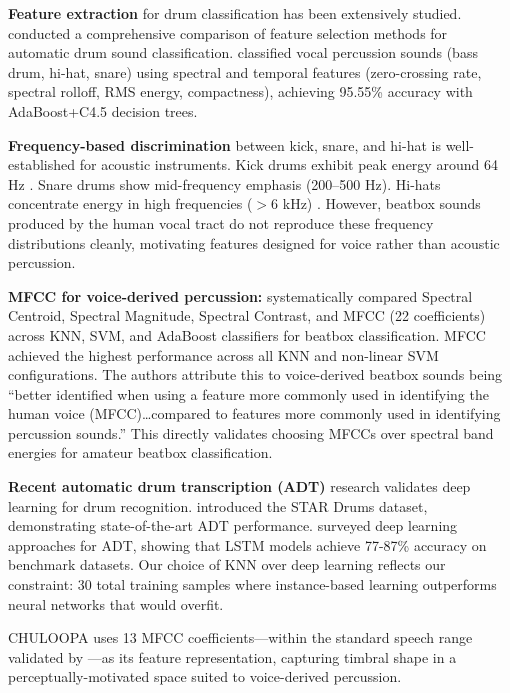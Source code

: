 \documentclass{aimc2026}
\begin{document}
\textbf{Feature extraction} for drum classification has been extensively studied. \citet{herrera2003automatic} conducted a comprehensive comparison of feature selection methods for automatic drum sound classification. \citet{sinyor2005beatbox} classified vocal percussion sounds (bass drum, hi-hat, snare) using spectral and temporal features (zero-crossing rate, spectral rolloff, RMS energy, compactness), achieving 95.55\% accuracy with AdaBoost+C4.5 decision trees.

\textbf{Frequency-based discrimination} between kick, snare, and hi-hat is well-established for acoustic instruments. Kick drums exhibit peak energy around 64 Hz \citep{lartillot2007unified}. Snare drums show mid-frequency emphasis (200--500 Hz). Hi-hats concentrate energy in high frequencies ($>$6 kHz) \citep{sillanpaa2000classification}. However, beatbox sounds produced by the human vocal tract do not reproduce these frequency distributions cleanly, motivating features designed for voice rather than acoustic percussion.

\textbf{MFCC for voice-derived percussion:} \citet{martanto2025beatbox} systematically compared Spectral Centroid, Spectral Magnitude, Spectral Contrast, and MFCC (22 coefficients) across KNN, SVM, and AdaBoost classifiers for beatbox classification. MFCC achieved the highest performance across all KNN and non-linear SVM configurations. The authors attribute this to voice-derived beatbox sounds being ``better identified when using a feature more commonly used in identifying the human voice (MFCC)\ldots compared to features more commonly used in identifying percussion sounds.'' This directly validates choosing MFCCs over spectral band energies for amateur beatbox classification.

\textbf{Recent automatic drum transcription (ADT)} research validates deep learning for drum recognition. \citet{weber2025star} introduced the STAR Drums dataset, demonstrating state-of-the-art ADT performance. \citet{cahyaningtyas2023deep} surveyed deep learning approaches for ADT, showing that LSTM models achieve 77-87\% accuracy on benchmark datasets. Our choice of KNN over deep learning reflects our constraint: 30 total training samples where instance-based learning outperforms neural networks that would overfit.

CHULOOPA uses 13 MFCC coefficients---within the standard speech range validated by \citet{martanto2025beatbox}---as its feature representation, capturing timbral shape in a perceptually-motivated space suited to voice-derived percussion.
\end{document}

